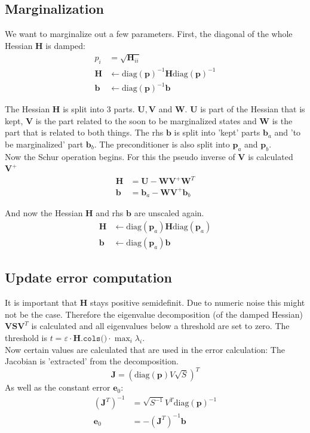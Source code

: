 \documentclass[10pt,a4paper]{article}
\numberwithin{equation}{section}
\renewcommand{\vec}[1]{\ensuremath{\mathbf{#1}}}
\newcommand{\mat}[1]{\ensuremath{\mathbf{#1}}}
\begin{document}
\subsection{Marginalization}
We want to marginalize out a few parameters.
First, the diagonal of the whole Hessian $\mat{H}$ is damped:
\begin{align}
p_i &= \sqrt{\mat{H}_{ii}}\\
\mat{H} &\leftarrow \mathrm{diag}(\vec{p})^{-1} \mat{H} \mathrm{diag}(\vec{p})^{-1}\\
\vec{b} &\leftarrow \mathrm{diag}(\vec{p})^{-1} \vec{b}
\end{align}

The Hessian $\mat{H}$ is split into 3 parts. $\mat{U}, \mat{V}$ and $\mat{W}$. $\mat{U}$ is part of the Hessian that is kept, $\mat{V}$ is the part related to the soon to be marginalized states and $\mat{W}$ is the part that is related to both things. 
The rhs $\vec{b}$ is split into 'kept' parts $\vec{b}_a$ and 'to be marginalized' part $\vec{b}_b$. The preconditioner is also split into $\vec{p}_a$ and $\vec{p}_b$.\\
Now the Schur operation begins. For this the pseudo inverse of $\mat{V}$ is calculated $\mat{V}^{+}$
\begin{align}
\mat{H} &= \mat{U} - \mat{W}\mat{V}^{+}\mat{W}^T\\
\vec{b} &= \vec{b}_a - \mat{W} \mat{V}^+\vec{b}_b
\end{align}

And now the Hessian $\mat{H}$ and rhs $\vec{b}$ are unscaled again.
\begin{align}
\mat{H} &\leftarrow \mathrm{diag}(\vec{p}_a) \mat{H} \mathrm{diag}(\vec{p}_a)\\
\vec{b} &\leftarrow \mathrm{diag}(\vec{p}_a) \vec{b}
\end{align}

\subsection{Update error computation}
It is important that $\mat{H}$ stays positive semidefinit. Due to numeric noise this might not be the case. Therefore the eigenvalue decomposition (of the damped Hessian) $\mat{V}\mat{S}\mat{V}^T$ is calculated and all eigenvalues below a threshold are set to zero. 
The threshold is $t = \varepsilon \cdot \mat{H}.\texttt{cols()} \cdot \max_i\lambda_i$.\\
Now certain values are calculated that are used in the error calculation:
The Jacobian is 'extracted' from the decomposition.
\begin{equation}
\mat{J} = \left(\mathrm{diag}(\vec{p})V\sqrt{S}\right)^T
\end{equation}
As well as the constant error $\vec{e}_0$:
\begin{align}
(\mat{J}^T)^{-1} &= \sqrt{S^{-1}}V^T\mathrm{diag}(\vec{p})^{-1}\\
\vec{e}_0 &= -(\mat{J}^T)^{-1}\vec{b}
\end{align}
\end{document}
